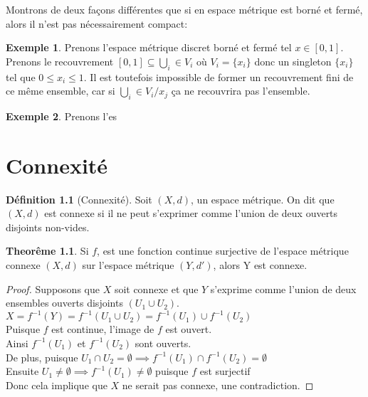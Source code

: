 \documentclass[12pt]{book}
\theoremstyle{definition}
\newtheorem{definition}{Définition}[section]
\newtheorem*{example}{Exemple}
\newtheorem{theorem}{Theorême}[section]
\begin{document}
Montrons de deux façons différentes que si en espace métrique est borné et fermé, alors il n'est pas nécessairement compact:

\begin{example}
    Prenons l'espace métrique discret borné et fermé tel $x \in [0, 1]$. Prenons le recouvrement $[0,1] \subseteq \bigcup_i\in V_i$ où $V_i = \{x_i\}$ donc 
    un singleton $\{x_i\}$ tel que $0 \leq x_i \leq 1$. Il est toutefois impossible de former un recouvrement fini de ce même ensemble, car si $\bigcup_i\in V_i / {x_j}$
    ça ne recouvrira pas l'ensemble.
\end{example}

\begin{example}
    Prenons l'es
\end{example}
\chapter{Connexité}
\begin{definition}[Connexité]
    \label{def:connexite}
    Soit $(X,d)$, un espace métrique. On dit que $(X,d)$ est connexe si il ne peut s'exprimer comme l'union de deux ouverts disjoints non-vides.
\end{definition}

\begin{theorem}
    Si $f$, est une fonction continue surjective de l'espace métrique connexe $(X,d)$ sur l'espace métrique $(Y, d')$, alors Y est connexe.
\end{theorem}

\begin{proof}
    Supposons que $X$ soit connexe et que $Y$ s'exprime comme l'union de deux ensembles ouverts disjoints $(U_1 \cup U_2)$.\\
    $X = f^{-1}(Y) = f^{-1}(U_1 \cup U_2) = f^{-1}(U_1) \cup f^{-1}(U_2)$\\
    Puisque $f$ est continue, l'image de $f$ est ouvert. \\
    Ainsi $f^{-1}(U_1)$ et $f^{-1}(U_2)$ sont ouverts.\\
    De plus, puisque $U_1 \cap U_2 = \emptyset \implies f^{-1}(U_1) \cap f^{-1}(U_2) = \emptyset$\\
    Ensuite $U_1 \neq \emptyset \implies f^{-1}(U_1) \neq \emptyset$ puisque $f$ est surjectif\\
    Donc cela implique que $X$ ne serait pas connexe, une contradiction.
\end{proof}

\appendix
\end{document}
